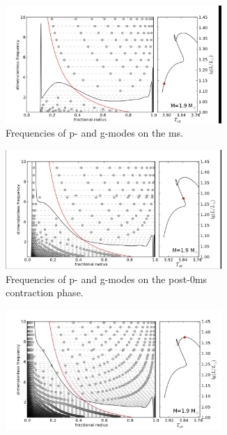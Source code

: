 \begin{figure}
	\centering
	\begin{subfigure}[b]{1\textwidth}
		\centering
		\includegraphics[width=0.9\textwidth, trim={3cm 1.3 1.2cm 1},clip]{propagation1.png}
		\caption{Frequencies of p- and g-modes on the ms. }
		\label{fig:y equals x}
	\end{subfigure}
	\hfill
	\begin{subfigure}[b]{1\textwidth}
		\centering
		\includegraphics[width=0.9\textwidth,trim={3cm 1.3 1.2cm 1},clip]{propagation2.png}
		\caption{Frequencies of p- and g-modes on the post-0ms contraction phase. }
		\label{fig:three sin x}
	\end{subfigure}
	\hfill
	\begin{subfigure}[b]{1\textwidth}
		\centering
		\includegraphics[width=0.9\textwidth,trim={3cm 1.3 1.2cm 1},clip]{propagation3.png}

\end{subfigure}
\end{figure}
